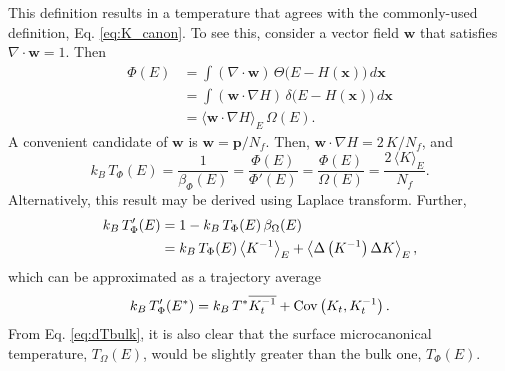 \documentclass[reprint]{revtex4-1}
\begin{document}
This definition results in a temperature that
agrees with the commonly-used definition,
Eq. \eqref{eq:K_canon}.
%
To see this,
consider a vector field $\mathbf w$
that satisfies $\nabla \cdot \mathbf w = 1$.
Then
%
\begin{align*}
  \Phi(E)
  &=
  \int
    \left(
      \nabla \cdot \mathbf w
    \right)
    \,
    \Theta\bigl(
      E - H(\mathbf x)
    \bigr)
    \, d\mathbf x
  \\
  &=
  \int
    \left( \mathbf w \cdot \nabla H \right)
    \,
    \delta\bigl(
      E - H(\mathbf x)
    \bigr)
    \, d\mathbf x
  \\
  &= \langle \mathbf w \cdot \nabla H \rangle_E
    \,
    \Omega(E)
  .
\end{align*}
%
A convenient candidate of $\mathbf w$ is
$\mathbf w = \mathbf p / N_f$.
%
Then,
$\mathbf w \cdot \nabla H = 2 \, K / N_f$,
and
%
\begin{equation}
  k_B \, T_\Phi(E)
  =
  \frac{ 1 } { \beta_\Phi(E) }
  =
  \frac{ \Phi(E) } { \Phi'(E) }
  =
  \frac{ \Phi(E) } { \Omega(E) }
  =
  \frac{ 2 \, \langle K \rangle_E } { N_f }
  .
  \label{eq:Tbulk}
\end{equation}
%
Alternatively, this result may be derived using
Laplace transform\cite{pearson1985, haile}.
%
Further\cite{cagin1988},
%
\begin{align}
  k_B \, T'_\Phi(E)
  &=
  1 - k_B \, T_\Phi(E) \, \beta_\Omega(E)
  \label{eq:dTbulk}
  \\
  &=
  k_B \, T_\Phi(E)
  \left\langle
  K^{-1}
  \right\rangle_E
  +
  \left\langle
  \Delta \left( K^{-1} \right)
  \Delta K
  \right\rangle_E
  ,
  \notag
\end{align}
%
which can be approximated as a trajectory average
%
\begin{equation}
  k_B \, T'_\Phi(E^*)
  =
  k_B \, T^* \overline{ K_t^{-1} }
  +
  \mathrm{Cov}\left(
    K_t, K_t^{-1}
  \right)
  .
  \notag
\end{equation}
%
From Eq. \eqref{eq:dTbulk},
it is also clear that the surface microcanonical temperature,
$T_\Omega(E)$,
would be slightly greater than the bulk one, $T_\Phi(E)$.
%
%
%
\end{document}
